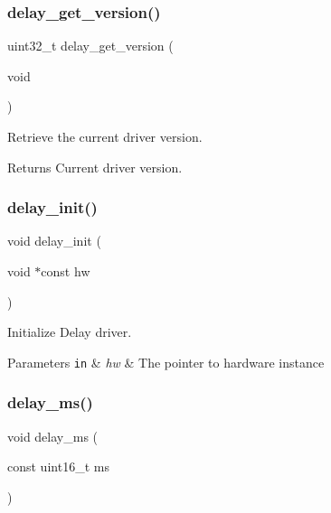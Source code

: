 \subsubsection{\texorpdfstring{delay\+\_\+get\+\_\+version()}{delay\_get\_version()}}
{\footnotesize\ttfamily uint32\+\_\+t delay\+\_\+get\+\_\+version (\begin{DoxyParamCaption}\item[{void}]{ }\end{DoxyParamCaption})}



Retrieve the current driver version. 

\begin{DoxyReturn}{Returns}
Current driver version. 
\end{DoxyReturn}
\mbox{\label{group__doc__driver__hal__delay_ga8f6bf53e286cef2eb222e9432a230836}} 
\subsubsection{\texorpdfstring{delay\+\_\+init()}{delay\_init()}}
{\footnotesize\ttfamily void delay\+\_\+init (\begin{DoxyParamCaption}\item[{void $\ast$const}]{hw }\end{DoxyParamCaption})}



Initialize Delay driver. 


\begin{DoxyParams}[1]{Parameters}
\mbox{\tt in}  & {\em hw} & The pointer to hardware instance \\
\hline
\end{DoxyParams}
\mbox{\label{group__doc__driver__hal__delay_gad2dd6e794004b50917d231195c324ce5}} 
\subsubsection{\texorpdfstring{delay\+\_\+ms()}{delay\_ms()}}
{\footnotesize\ttfamily void delay\+\_\+ms (\begin{DoxyParamCaption}\item[{const uint16\+\_\+t}]{ms }\end{DoxyParamCaption})}



